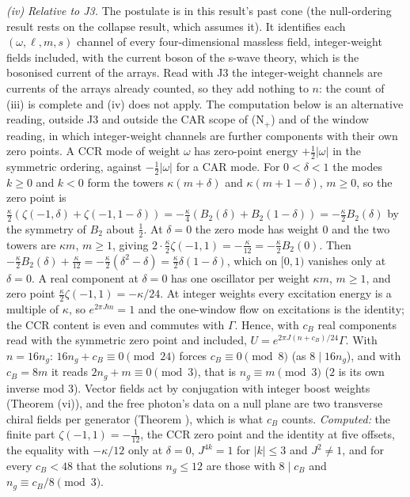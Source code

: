 \emph{(iv)} \emph{Relative to J3.} The postulate  is in this result's past cone (the null-ordering result rests on the collapse result, which assumes it). It identifies each $(\omega, \ell, m, s)$ channel of every four-dimensional massless field, integer-weight fields included, with the current boson of the s-wave theory, which is the bosonised current of the arrays. Read with J3 the integer-weight channels are currents of the arrays already counted, so they add nothing to $n$: the count of (iii) is complete and (iv) does not apply. The computation below is an alternative reading, outside J3 and outside the CAR scope of (N$_{+}$) and of the window reading, in which integer-weight channels are further components with their own zero points. A CCR mode of weight $\omega$ has zero-point energy $+\tfrac12|\omega|$ in the symmetric ordering, against $-\tfrac12|\omega|$ for a CAR mode. For $0 < \delta < 1$ the modes $k \ge 0$ and $k < 0$ form the towers $\kappa(m + \delta)$ and $\kappa(m + 1 - \delta)$, $m \ge 0$, so the zero point is $\tfrac{\kappa}{2}(\zeta(-1, \delta) + \zeta(-1, 1 - \delta)) = -\tfrac{\kappa}{4}(B_{2}(\delta) + B_{2}(1 - \delta)) = -\tfrac{\kappa}{2}B_{2}(\delta)$ by the symmetry of $B_{2}$ about $\tfrac12$. At $\delta = 0$ the zero mode has weight $0$ and the two towers are $\kappa m$, $m \ge 1$, giving $2\cdot\tfrac{\kappa}{2}\zeta(-1, 1) = -\tfrac{\kappa}{12} = -\tfrac{\kappa}{2}B_{2}(0)$. Then $-\tfrac{\kappa}{2}B_{2}(\delta) + \tfrac{\kappa}{12} = -\tfrac{\kappa}{2}(\delta^{2} - \delta) = \tfrac{\kappa}{2}\delta(1 - \delta)$, which on $[0, 1)$ vanishes only at $\delta = 0$. A real component at $\delta = 0$ has one oscillator per weight $\kappa m$, $m \ge 1$, and zero point $\tfrac{\kappa}{2}\zeta(-1, 1) = -\kappa/24$. At integer weights every excitation energy is a multiple of $\kappa$, so $e^{2\pi Jm} = 1$ and the one-window flow on excitations is the identity; the CCR content is even and commutes with $\Gamma$. Hence, with $c_{B}$ real components read with the symmetric zero point and included, $U = e^{2\pi J(n + c_{B})/24}\Gamma$. With $n = 16n_{g}$: $16n_{g} + c_{B} \equiv 0 \pmod{24}$ forces $c_{B} \equiv 0 \pmod 8$ (as $8 \mid 16n_{g}$), and with $c_{B} = 8m$ it reads $2n_{g} + m \equiv 0 \pmod 3$, that is $n_{g} \equiv m \pmod 3$ ($2$ is its own inverse mod $3$). Vector fields act by conjugation with integer boost weights (Theorem (vi)), and the free photon's data on a null plane are two transverse chiral fields per generator (Theorem ), which is what $c_{B}$ counts. \emph{Computed:} the finite part $\zeta(-1, 1) = -\tfrac1{12}$, the CCR zero point and the identity at five offsets, the equality with $-\kappa/12$ only at $\delta = 0$, $J^{4k} = 1$ for $|k| \le 3$ and $J^{2} \neq 1$, and for every $c_{B} < 48$ that the solutions $n_{g} \le 12$ are those with $8 \mid c_{B}$ and $n_{g} \equiv c_{B}/8 \pmod 3$.

